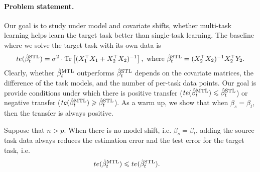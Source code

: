\paragraph{Problem statement.} Our goal is to study under model and covariate shifts, whether multi-task learning helps learn the target task better than single-task learning.
The baseline where we solve the target task with its own data is
\begin{align*}
	te(\hat{\beta}_t^{\text{STL}}) = \sigma^2 \cdot \operatorname{Tr}\left[(X_1^{\top}X_1 + X_2^{\top}X_2)^{-1}\right], \text{ where } \hat{\beta}_t^{\text{STL}} = (X_2^{\top}X_2)^{-1} X_2^{\top}Y_2.
\end{align*}
Clearly, whether $\hat{\beta}_t^{\text{MTL}}$ outperforms $\hat{\beta}_t^{\text{STL}}$ depends on the covariate matrices, the difference of the task models, and the number of per-task data points.
Our goal is provide conditions under which there is positive transfer ($te(\hat{\beta}_t^{\text{MTL}}) \leqslant \hat{\beta}_t^{\text{STL}}$) or negative transfer ($te(\hat{\beta}_t^{\text{MTL}}) \geqslant \hat{\beta}_t^{\text{STL}}$).
As a warm up, we show that when $\beta_s = \beta_t$, then the transfer is always positive.

\begin{proposition}\label{prop_monotone}
	Suppose that $n > p$.
  When there is no model shift, i.e. $\beta_s = \beta_t$, adding the source task data always reduces the estimation error and the test error for the target task, i.e.
	\begin{align}
		te(\hat{\beta}_{t}^{\text{MTL}}) &\leqslant te(\hat{\beta}_t^{\text{STL}}). \label{eq_mono_te}
	\end{align}
\end{proposition}

